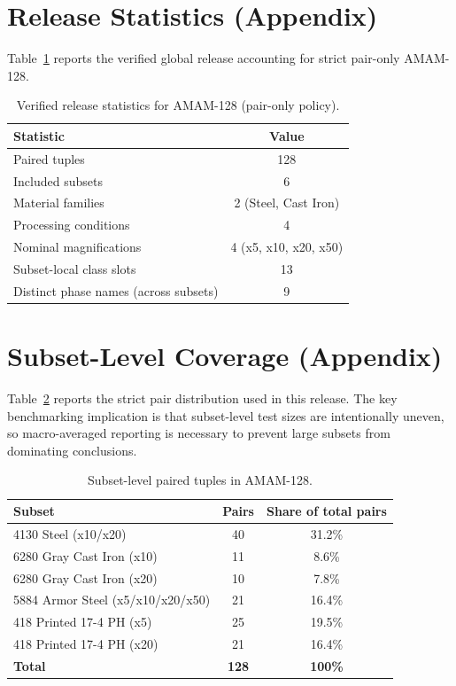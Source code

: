 \documentclass{article}
\newcommand{\datasetname}{AMAM-128}
\newcommand{\paircount}{128}
\newcommand{\subsetcount}{6}
\newcommand{\tablefontsize}{\small}
\begin{document}
\section{Release Statistics (Appendix)}\label{app:release}
Table~\ref{tab:globalstats} reports the verified global release accounting for strict pair-only AMAM-128.
\begin{table}[ht]
    \centering
    \tablefontsize
    \caption{Verified release statistics for \datasetname{} (pair-only policy).}
    \label{tab:globalstats}
    \begin{tabular}{lc}
        \toprule
        Statistic & Value \\
        \midrule
        Paired tuples & \paircount{} \\
        Included subsets & \subsetcount{} \\
        Material families & 2 (Steel, Cast Iron) \\
        Processing conditions & 4 \\
        Nominal magnifications & 4 (x5, x10, x20, x50) \\
        Subset-local class slots & 13 \\
        Distinct phase names (across subsets) & 9 \\
        \bottomrule
    \end{tabular}
\end{table}

\section{Subset-Level Coverage (Appendix)}\label{app:subset}
Table~\ref{tab:subsetcoverage} reports the strict pair distribution used in this release. The key benchmarking implication is that subset-level test sizes are intentionally uneven, so macro-averaged reporting is necessary to prevent large subsets from dominating conclusions.
\begin{table}[ht]
    \centering
    \tablefontsize
    \caption{Subset-level paired tuples in \datasetname{}.}
    \label{tab:subsetcoverage}
    \begin{tabular}{lcc}
        \toprule
        Subset & Pairs & Share of total pairs \\
        \midrule
        4130 Steel (x10/x20) & 40 & 31.2\% \\
        6280 Gray Cast Iron (x10) & 11 & 8.6\% \\
        6280 Gray Cast Iron (x20) & 10 & 7.8\% \\
        5884 Armor Steel (x5/x10/x20/x50) & 21 & 16.4\% \\
        418 Printed 17-4 PH (x5) & 25 & 19.5\% \\
        418 Printed 17-4 PH (x20) & 21 & 16.4\% \\
        \midrule
        \textbf{Total} & \textbf{128} & \textbf{100\%} \\
        \bottomrule
    \end{tabular}
\end{table}
\end{document}
